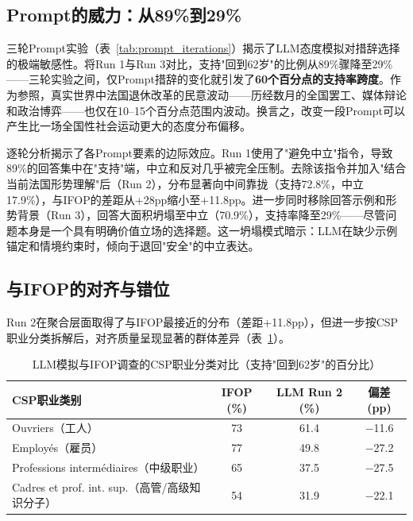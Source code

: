 \documentclass[11pt,a4paper]{ctexart}
\begin{document}
\subsection{Prompt的威力：从89\%到29\%}

三轮Prompt实验（表~\ref{tab:prompt_iterations}）揭示了LLM态度模拟对措辞选择的极端敏感性。将Run 1与Run 3对比，支持"回到62岁"的比例从89\%骤降至29\%——三轮实验之间，仅Prompt措辞的变化就引发了\textbf{60个百分点的支持率跨度}。作为参照，真实世界中法国退休改革的民意波动——历经数月的全国罢工、媒体辩论和政治博弈——也仅在10--15个百分点范围内波动。换言之，改变一段Prompt可以产生比一场全国性社会运动更大的态度分布偏移。

逐轮分析揭示了各Prompt要素的边际效应。Run 1使用了"避免中立"指令，导致89\%的回答集中在"支持"端，中立和反对几乎被完全压制。去除该指令并加入"结合当前法国形势理解"后（Run 2），分布显著向中间靠拢（支持72.8\%，中立17.9\%），与IFOP的差距从+28pp缩小至+11.8pp。进一步同时移除回答示例和形势背景（Run 3），回答大面积坍塌至中立（70.9\%），支持率降至29\%——尽管问题本身是一个具有明确价值立场的选择题。这一坍塌模式暗示：LLM在缺少示例锚定和情境约束时，倾向于退回"安全"的中立表达。

\subsection{与IFOP的对齐与错位}

Run 2在聚合层面取得了与IFOP最接近的分布（差距+11.8pp），但进一步按CSP职业分类拆解后，对齐质量呈现显著的群体差异（表~\ref{tab:occupation_compare}）。

\begin{table}[H]
    \centering
    \caption{LLM模拟与IFOP调查的CSP职业分类对比（支持"回到62岁"的百分比）}
    \label{tab:occupation_compare}
    \begin{tabular}{@{}lccc@{}}
        \toprule
        \textbf{CSP职业类别} & \textbf{IFOP (\%)} & \textbf{LLM Run 2 (\%)} & \textbf{偏差 (pp)} \\
        \midrule
        Ouvriers（工人） & 73 & 61.4 & $-$11.6 \\
        Employés（雇员） & 77 & 49.8 & $-$27.2 \\
        Professions intermédiaires（中级职业） & 65 & 37.5 & $-$27.5 \\
        Cadres et prof. int. sup.（高管/高级知识分子） & 54 & 31.9 & $-$22.1 \\
        \bottomrule
    \end{tabular}
\end{table}
\end{document}
